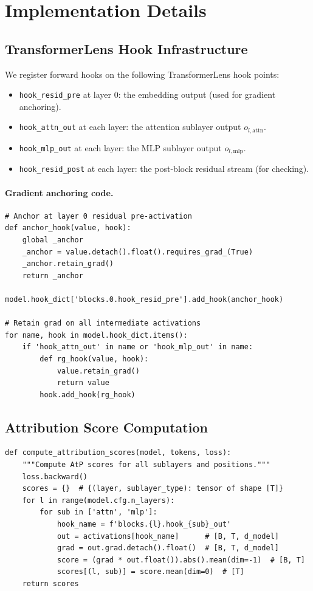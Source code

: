 \documentclass{article}
\newcommand{\attn}{\mathrm{attn}}
\newcommand{\mlp}{\mathrm{mlp}}
\begin{document}
\section{Implementation Details}
\label{app:impl}

\subsection{TransformerLens Hook Infrastructure}

We register forward hooks on the following TransformerLens hook points:
\begin{itemize}
  \item \texttt{hook\_resid\_pre} at layer 0: the embedding output (used for gradient anchoring).
  \item \texttt{hook\_attn\_out} at each layer: the attention sublayer output $o_{l,\attn}$.
  \item \texttt{hook\_mlp\_out} at each layer: the MLP sublayer output $o_{l,\mlp}$.
  \item \texttt{hook\_resid\_post} at each layer: the post-block residual stream (for checking).
\end{itemize}

\paragraph{Gradient anchoring code.}
\begin{verbatim}
# Anchor at layer 0 residual pre-activation
def anchor_hook(value, hook):
    global _anchor
    _anchor = value.detach().float().requires_grad_(True)
    _anchor.retain_grad()
    return _anchor

model.hook_dict['blocks.0.hook_resid_pre'].add_hook(anchor_hook)

# Retain grad on all intermediate activations
for name, hook in model.hook_dict.items():
    if 'hook_attn_out' in name or 'hook_mlp_out' in name:
        def rg_hook(value, hook):
            value.retain_grad()
            return value
        hook.add_hook(rg_hook)
\end{verbatim}

\subsection{Attribution Score Computation}

\begin{verbatim}
def compute_attribution_scores(model, tokens, loss):
    """Compute AtP scores for all sublayers and positions."""
    loss.backward()
    scores = {}  # {(layer, sublayer_type): tensor of shape [T]}
    for l in range(model.cfg.n_layers):
        for sub in ['attn', 'mlp']:
            hook_name = f'blocks.{l}.hook_{sub}_out'
            out = activations[hook_name]      # [B, T, d_model]
            grad = out.grad.detach().float()  # [B, T, d_model]
            score = (grad * out.float()).abs().mean(dim=-1)  # [B, T]
            scores[(l, sub)] = score.mean(dim=0)  # [T]
    return scores
\end{verbatim}
\end{document}
